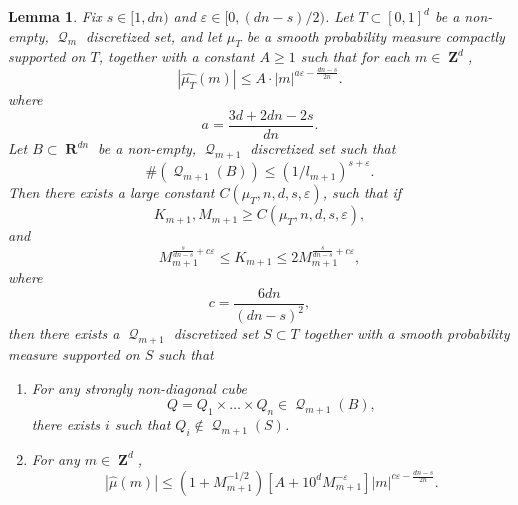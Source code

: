 \documentclass[12pt,reqno]{article}
\newtheorem{lemma}[theorem]{Lemma}
\DeclareMathOperator{\RR}{\mathbf{R}}
\DeclareMathOperator{\ZZ}{\mathbf{Z}}
\DeclareMathOperator{\DQ}{\mathcal{Q}}
\begin{document}
\begin{lemma} \label{discreteLemma}
    Fix $s \in [1,dn)$ and $\varepsilon \in [0,(dn-s)/2)$. Let $T \subset [0,1]^d$ be a non-empty, $\DQ_m$ discretized set, and let $\mu_T$ be a smooth probability measure compactly supported on $T$, together with a constant $A \geq 1$ such that for each $m \in \ZZ^d$,
    \[ |\widehat{\mu_T}(m)| \leq A \cdot |m|^{a\varepsilon-\frac{dn-s}{2n}}. \]
    where
    \[ a = \frac{3d + 2dn - 2s}{dn}. \]
    Let $B \subset \RR^{dn}$ be a non-empty, $\DQ_{m+1}$ discretized set such that
    \begin{equation} \label{equation1290419204912090120912}
       \#(\DQ_{m+1}(B)) \leq (1/l_{m+1})^{s + \varepsilon}.
    \end{equation}
    Then there exists a large constant $C(\mu_T,n,d,s,\varepsilon)$, such that if
    \begin{equation} \label{equation1095121284102}
        K_{m+1}, M_{m+1} \geq C(\mu_T,n,d,s,\varepsilon),
    \end{equation}
    and
    \begin{equation} \label{equation5890129048128941891}
        M_{m+1}^{\frac{s}{dn-s} + c\varepsilon} \leq K_{m+1} \leq 2 M_{m+1}^{\frac{s}{dn-s} + c \varepsilon},
    \end{equation}
    where
    \[ c = \frac{6dn}{(dn - s)^2}, \]
    then there exists a $\DQ_{m+1}$ discretized set $S \subset T$ together with a smooth probability measure supported on $S$ such that
    \begin{enumerate}
        \item[(A)] For any strongly non-diagonal cube
        \[ Q = Q_1 \times \dots \times Q_n \in \DQ_{m+1}(B), \]
        there exists $i$ such that $Q_i \not \in \DQ_{m+1}(S)$.

        \item[(B)] For any $m \in \ZZ^d$,
        \[ |\widehat{\mu}(m)| \leq (1 + M_{m+1}^{-1/2}) [A + 10^d M_{m+1}^{-\varepsilon}] |m|^{c\varepsilon - \frac{dn-s}{2n}}. \]
    \end{enumerate}
\end{lemma}
\end{document}
